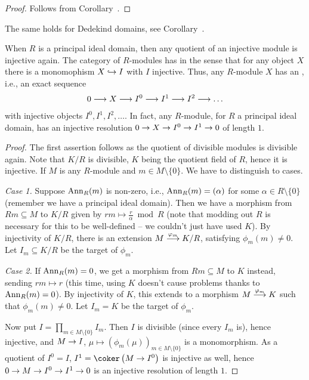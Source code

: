 \documentclass[a4paper,parskip=half,numbers=enddot, DIV=12]{scrreprt}
\begin{document}
\begin{proof}
	Follows from Corollary~.
\end{proof}
\begin{rem*}
	The same holds for Dedekind domains, see Corollary~.
\end{rem*}
\begin{cor}
	When $R$ is a principal ideal domain, then any quotient of an injective module is injective again. The category of $R$-modules has  in the sense that for any object $X$ there is a monomophism $X\monomorphism I$ with $I$ injective. Thus, any $R$-module $X$ has an , i.e., an exact sequence
	\begin{align*}
	0\morphism X\morphism I^0\morphism I^1\morphism I^2\morphism\ldots
	\end{align*}
	with injective objects $I^0,I^1,I^2,\ldots$. In fact, any $R$-module, for $R$ a principal ideal domain, has an injective resolution $0\morphism X\morphism I^0\morphism I^1\morphism 0$ of length $1$.
\end{cor}
\begin{proof}
	The first assertion follows as the quotient of divisible modules is divisible again. Note that $K/R$ is divisible, $K$ being the quotient field of $R$, hence it is injective. If $M$ is any $R$-module and $m\in M\setminus\{0\}$. We have to distinguish to cases.
	
	\emph{Case 1.} Suppose $\operatorname{Ann}_R(m)$ is non-zero, i.e., $\operatorname{Ann}_R(m)=(\alpha)$ for some $\alpha\in R\setminus \{0\}$ (remember we have a principal ideal domain). Then we have a morphism from $Rm\subseteq M$ to $K/R$ given by $rm\mapsto \frac{r}{\alpha}\bmod R$ (note that modding out $R$ is necessary for this to be well-defined -- we couldn't just have used $K$). By injectivity of $K/R$, there is an extension $M\morphism[\phi_m]K/R$, satisfying $\phi_m(m)\neq 0$. Let $I_m\subseteq K/R$ be the target of $\phi_m$.
	
	\emph{Case 2.} If $\operatorname{Ann}_R(m)=0$, we get a morphism from $Rm\subseteq M$ to $K$ instead, sending $rm\mapsto r$ (this time, using $K$ doesn't cause problems thanks to $\operatorname{Ann}_R(m)=0$). By injectivity of $K$, this extends to a morphism $M\morphism[\phi_m]K$ such that $\phi_m(m)\neq0$. Let $I_m=K$ be the target of $\phi_m$.
	
	Now put $I=\prod_{m\in M\setminus\{0\}}I_m$. Then $I$ is divisible (since every $I_m$ is), hence injective, and $M\morphism I$, $\mu\mapsto\left(\phi_m(\mu)\right)_{m\in M\setminus\{0\}}$ is a monomorphism. As a quotient of $I^0=I$, $I^1=\coker\left(M\morphism I^0\right)$ is injective as well, hence $0\morphism M\morphism I^0\morphism I^1\morphism 0$ is an injective resolution of length $1$.
\end{proof}
\end{document}
